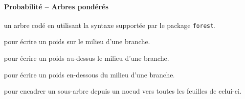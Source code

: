 \documentclass[12pt,a4paper]{article}
\begin{document}
\paragraph{Probabilité -- Arbres pondérés}



\Content{} un arbre codé en utilisant la syntaxe supportée par le package \verb+forest+.

 pour écrire un poids sur le milieu d'une branche.

 pour écrire un poids au-dessus le milieu d'une branche.

 pour écrire un poids en-dessous du milieu d'une branche.

 pour encadrer un sous-arbre depuis un noeud vers toutes les feuilles de celui-ci.
\end{document}
